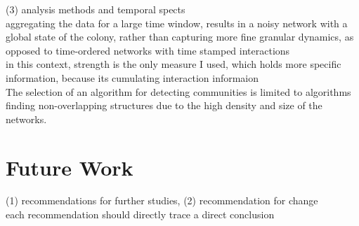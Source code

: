 (3) analysis methods and temporal spects\\
aggregating the data for a large time window, results in a noisy network with a global state of the colony, rather than capturing more fine granular dynamics, as opposed to time-ordered networks with time stamped interactions\\
in this context, strength is the only measure I used, which holds more specific information, because its cumulating interaction informaion\\
The selection of an algorithm for detecting communities is limited to algorithms finding non-overlapping structures due to the high density and size of the networks.

\section{Future Work}
(1) recommendations for further studies, (2) recommendation for change\\
each recommendation should directly trace a direct conclusion\\

